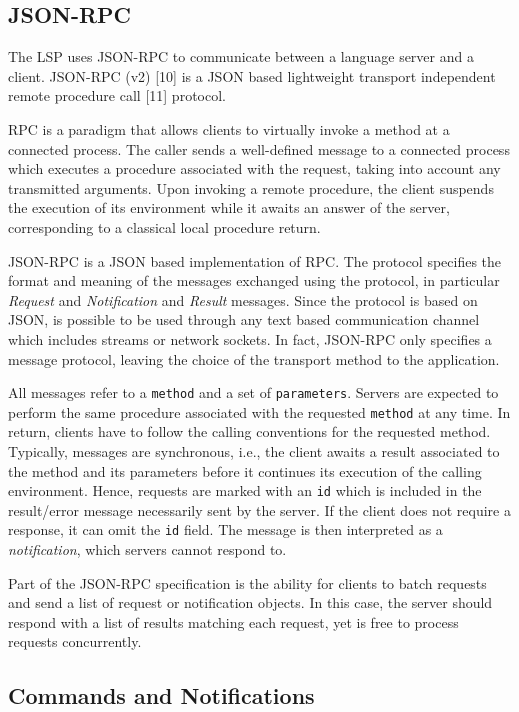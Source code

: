 \documentclass[
  a4paper,
  bibtex,
  english,
  nomenclature]{kthlatex/kththesis/kththesis}
\begin{document}
\hypertarget{sec:json-rpc}{%
\subsection{JSON-RPC}\label{sec:json-rpc}}

The LSP uses JSON-RPC to communicate between a language server and a
client. JSON-RPC (v2) {[}10{]} is a JSON based lightweight transport
independent remote procedure call {[}11{]} protocol.

RPC is a paradigm that allows clients to virtually invoke a method at a
connected process. The caller sends a well-defined message to a
connected process which executes a procedure associated with the
request, taking into account any transmitted arguments. Upon invoking a
remote procedure, the client suspends the execution of its environment
while it awaits an answer of the server, corresponding to a classical
local procedure return.

JSON-RPC is a JSON based implementation of RPC. The protocol specifies
the format and meaning of the messages exchanged using the protocol, in
particular \emph{Request} and \emph{Notification} and \emph{Result}
messages. Since the protocol is based on JSON, is possible to be used
through any text based communication channel which includes streams or
network sockets. In fact, JSON-RPC only specifies a message protocol,
leaving the choice of the transport method to the application.

All messages refer to a \texttt{method} and a set of
\texttt{parameters}. Servers are expected to perform the same procedure
associated with the requested \texttt{method} at any time. In return,
clients have to follow the calling conventions for the requested method.
Typically, messages are synchronous, i.e., the client awaits a result
associated to the method and its parameters before it continues its
execution of the calling environment. Hence, requests are marked with an
\texttt{id} which is included in the result/error message necessarily
sent by the server. If the client does not require a response, it can
omit the \texttt{id} field. The message is then interpreted as a
\emph{notification}, which servers cannot respond to.

Part of the JSON-RPC specification is the ability for clients to batch
requests and send a list of request or notification objects. In this
case, the server should respond with a list of results matching each
request, yet is free to process requests concurrently.

\hypertarget{sec:commands-and-notifications}{%
\subsection{Commands and
Notifications}\label{sec:commands-and-notifications}}
\end{document}
